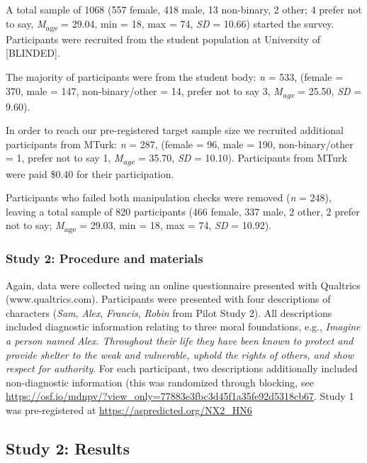 \documentclass[
  man,floatsintext]{apa7}
\begin{document}
A total sample of 1068 (557 female, 418 male, 13 non-binary, 2 other; 4 prefer not to say, \emph{M}\textsubscript{age} = 29.04, min = 18, max = 74, \emph{SD} = 10.66) started the survey. Participants were recruited from the student population at University of {[}BLINDED{]}.

The majority of participants were from the student body: \emph{n} = 533, (female = 370, male = 147, non-binary/other = 14, prefer not to say 3, \emph{M\textsubscript{age}} = 25.50, \emph{SD} = 9.60).

In order to reach our pre-registered target sample size we recruited additional participants from MTurk: \emph{n} = 287, (female = 96, male = 190, non-binary/other = 1, prefer not to say 1, \emph{M\textsubscript{age}} = 35.70, \emph{SD} = 10.10). Participants from MTurk were paid \$0.40 for their participation.

Participants who failed both manipulation checks were removed (\emph{n} = 248), leaving a total sample of 820 participants (466 female, 337 male, 2 other, 2 prefer not to say; \emph{M}\textsubscript{age} = 29.03, min = 18, max = 74, \emph{SD} = 10.92).

\subsubsection{Study 2: Procedure and materials}\label{study-2-procedure-and-materials}

Again, data were collected using an online questionnaire presented with Qualtrics (www.qualtrics.com). Participants were presented with four descriptions of characters (\emph{Sam}, \emph{Alex}, \emph{Francis}, \emph{Robin} from Pilot Study 2). All descriptions included diagnostic information relating to three moral foundations, e.g., \emph{Imagine a person named Alex. Throughout their life they have been known to protect and provide shelter to the weak and vulnerable, uphold the rights of others, and show respect for authority}. For each participant, two descriptions additionally included non-diagnostic information (this was randomized through blocking, see \color{blue}\url{https://osf.io/mdnpv/?view_only=77883e3fbc3d45f1a35fe92d5318cb67}\color{black}. Study 1 was pre-registered at \color{blue}\url{https://aspredicted.org/NX2_HN6}\color{black}

\subsection{Study 2: Results}\label{study-2-results}
\end{document}
